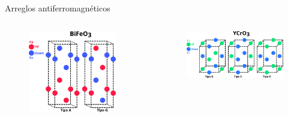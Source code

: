 \begin{frame}{Arreglos antiferromagn\'eticos}
      \begin{columns}[t]
        \begin{figure}[H]
            \centering
            \includegraphics[width=0.9\textwidth]{contenido/teoria/img_teoria/BFO_unido.png}
        \end{figure}
        \begin{figure}[H]
            \centering
            \includegraphics[width=1.0\textwidth]{contenido/teoria/img_teoria/YCO_unido.png}
        \end{figure}
    \end{columns}
\end{frame}